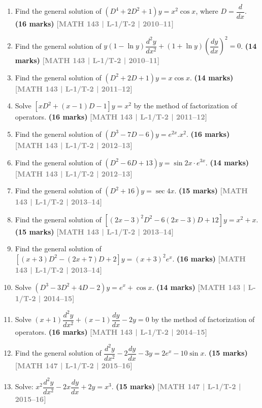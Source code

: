 \documentclass[12pt,a4paper]{article}
\newcommand{\yr}[1]{\hfill\textcolor{gray}{\small\textbf{[#1]}}}
\newcommand{\mk}[1]{\textcolor{orange!70!black}{\small\textbf{(#1 marks)}}}
\begin{document}
\begin{enumerate}

\item Find the general solution of $(D^{4}+2D^{2}+1)y=x^{2}\cos x$, where $D=\dfrac{d}{dx}$.
\mk{16} \yr{MATH 143 | L-1/T-2 | 2010--11}

\item Find the general solution of $y(1-\ln y)\dfrac{d^{2}y}{dx^{2}}+(1+\ln y)\left(\dfrac{dy}{dx}\right)^{2}=0$.
\mk{14} \yr{MATH 143 | L-1/T-2 | 2010--11}

\item Find the general solution of $(D^{2}+2D+1)y=x\cos x$.
\mk{14} \yr{MATH 143 | L-1/T-2 | 2011--12}

\item Solve $[xD^{2}+(x-1)D-1]y=x^{2}$ by the method of factorization of operators.
\mk{16\textonehalf} \yr{MATH 143 | L-1/T-2 | 2011--12}

\item Find the general solution of $(D^{3}-7D-6)y=e^{2x}.x^{2}$.
\mk{16\textonehalf} \yr{MATH 143 | L-1/T-2 | 2012--13}

\item Find the general solution of $(D^{2}-6D+13)y=\sin 2x\cdot e^{3x}$.
\mk{14} \yr{MATH 143 | L-1/T-2 | 2012--13}

\item Find the general solution of $(D^{2}+16)y=\sec 4x$.
\mk{15} \yr{MATH 143 | L-1/T-2 | 2013--14}

\item Find the general solution of $[(2x-3)^{2}D^{2}-6(2x-3)D+12]y=x^{2}+x$.
\mk{15} \yr{MATH 143 | L-1/T-2 | 2013--14}

\item Find the general solution of $[(x+3)D^{2}-(2x+7)D+2]y=(x+3)^{2}e^{x}$.
\mk{16\textonehalf} \yr{MATH 143 | L-1/T-2 | 2013--14}

\item Solve $(D^{3}-3D^{2}+4D-2)y=e^{x}+\cos x$.
\mk{14} \yr{MATH 143 | L-1/T-2 | 2014--15}

\item Solve $(x+1)\dfrac{d^{2}y}{dx^{2}}+(x-1)\dfrac{dy}{dx}-2y=0$ by the method of factorization of operators.
\mk{16} \yr{MATH 143 | L-1/T-2 | 2014--15}

\item Find the general solution of $\dfrac{d^{2}y}{dx^{2}}-2\dfrac{dy}{dx}-3y=2e^{x}-10\sin x$.
\mk{15} \yr{MATH 147 | L-1/T-2 | 2015--16}

\item Solve: $x^{2}\dfrac{d^{2}y}{dx^{2}}-2x\dfrac{dy}{dx}+2y=x^{3}$.
\mk{15} \yr{MATH 147 | L-1/T-2 | 2015--16}


\end{enumerate}
\end{document}
